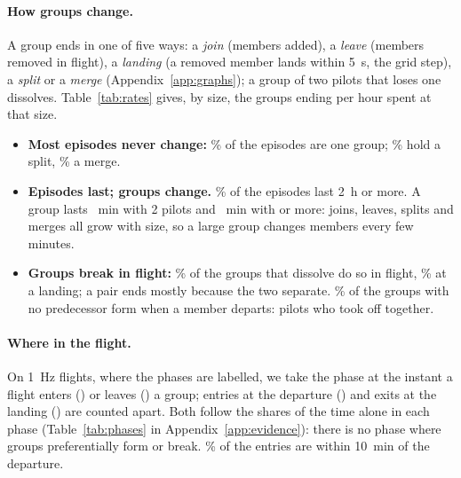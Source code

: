 \paragraph{How groups change.}\label{sec:describe} A group ends in one of five ways: a
\emph{join} (members added), a \emph{leave} (members removed in flight), a \emph{landing} (a
removed member lands within 5~s, the grid step), a \emph{split} or a \emph{merge}
(Appendix~\ref{app:graphs}); a group of two pilots that loses one dissolves.
Table~\ref{tab:rates} gives, by size, the groups ending per hour spent at that size.
\begin{itemize}
  \item \textbf{Most episodes never change:} \StEpisodeSingle\% of the \StEpisodes{} episodes are one
        group; \StEpisodeSplit\% hold a split, \StEpisodeMerge\% a merge.
  \item \textbf{Episodes last; groups change.} \StEpisodeTwoHours\% of the episodes last 2~h or
        more. A group lasts \StMedianGroupTwo~min with 2 pilots and \StMedianGroupMax~min with
        \StSizeMax{} or more: joins, leaves, splits and merges all grow with size, so a large group
        changes members every few minutes.
  \item \textbf{Groups break in flight:} \StEndFlight\% of the \StEnds{} groups that dissolve do
        so in flight, \StEndLanding\% at a landing; a pair ends mostly because the two separate.
        \StFormDeparture\% of the \StFormations{} groups with no predecessor form when a member
        departs: pilots who took off together.
\end{itemize}

\begin{table}
\centering
\footnotesize

\caption{By size: hours spent, median duration of a group, and groups ending per hour by
outcome, with 5--95\% bands.}
\label{tab:rates}
\end{table}

\paragraph{Where in the flight.}\label{sec:phases} On 1~Hz flights, where the phases are labelled,
we take the phase at the instant a flight enters (\Entries{}) or leaves (\Exits{}) a group; entries
at the departure (\AtDeparture{}) and exits at the landing (\AtLanding{}) are counted apart. Both
follow the shares of the time alone in each phase (Table~\ref{tab:phases} in
Appendix~\ref{app:evidence}): there is no phase where groups preferentially form or break.
\EntriesEarly\% of the entries are within 10~min of the departure.

